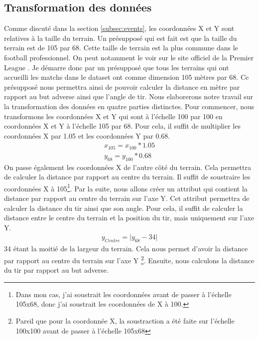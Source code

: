 \documentclass[12pt]{article}
\begin{document}
\subsection{Transformation des données}
Comme discuté dans la section \ref{subsec:events}, les coordonnées X et Y sont relatives à la taille du terrain.
Un présupposé qui est fait est que la taille du terrain est de 105 par 68.
Cette taille de terrain est la plus commune dans le football professionnel.
On peut notamment le voir sur le site officiel de la Premier League \cite{PremierLeagueClubs}.
Je démarre donc par un présupposé que tous les terrains qui ont accueilli les matchs dans le dataset ont comme dimension 105 mètres par 68.
Ce présupposé nous permettra ainsi de pouvoir calculer la distance en mètre par rapport au but adverse ainsi que l'angle de tir.
\newpage
Nous elaborerons notre travail sur la transformation des données en quatre parties distinctes.
Pour commencer, nous transformons les coordonnées X et Y qui sont à l'échelle 100 par 100 en coordonnées X et Y à l'échelle 105 par 68.
Pour cela, il suffit de multiplier les coordonnées X par 1.05 et les coordonnées Y par 0.68.
\begin{equation}
    \begin{split}
        x_{105} = x_{100} * 1.05 \\
        y_{68} = y_{100} * 0.68
    \end{split}
\end{equation}
On passe également les coordonnées X de l'autre côté du terrain. 
Cela permettra de calculer la distance par rapport au centre du terrain.
Il suffit de soustraire les coordonnées X à 105\footnote{Dans mon cas, j'ai soustrait les coordonnées avant de passer à l'échelle 105x68, donc j'ai soustrait les coordonnées de X à 100.}.
\newline\newline
Par la suite, nous allons créer un attribut qui contient la distance par rapport au centre du terrain sur l'axe Y.
Cet attribut permettra de calculer la distance du tir ainsi que son angle.
Pour cela, il suffit de calculer la distance entre le centre du terrain et la position du tir, mais uniquement sur l'axe Y.
\begin{equation}
    \begin{split}
        y_{Centre} = \lvert y_{68} - 34 \rvert
    \end{split}
\end{equation}
34 étant la moitié de la largeur du terrain. 
Cela nous permet d'avoir la distance par rapport au centre du terrain sur l'axe Y \footnote{Pareil que pour la coordonnée X, la soustraction a été faite sur l'échelle 100x100 avant de passer à l'échelle 105x68}.
\newline\newline
Ensuite, nous calculons la distance du tir par rapport au but adverse.
\end{document}

